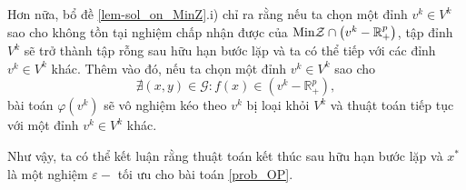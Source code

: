 \begin{cm}
Hơn nữa, bổ đề \ref{lem-sol_on_MinZ}.i) chỉ ra rằng nếu ta chọn một đỉnh $v^{k}\in V^{k}$ sao cho không tồn tại nghiệm chấp nhận được của ${\rm Min}\mathcal{Z}\cap\left(v^{k}-\mathbb{R}_{+}^{p}\right)$, tập đỉnh $V^{k}$ sẽ trở thành tập rỗng sau hữu hạn bước lặp và ta có thể tiếp với các đỉnh $v^{k}\in V^{k}$ khác. Thêm vào đó, nếu ta chọn một đỉnh $v^{k}\in V^{k}$ sao cho 
\[
\nexists (x,y)\in\mathcal{G}:f\left(x\right)\in\left(v^{k}-\mathbb{R}_{+}^{p}\right),
\]
bài toán $\varphi\left(v^{k}\right)$ sẽ vô nghiệm kéo theo
$v^{k}$ bị loại khỏi $V^{k}$ và thuật toán tiếp tục với một đỉnh
$v^{k}\in V^{k}$ khác.

Như vậy, ta có thể kết luận rằng thuật toán kết thúc sau hữu hạn bước lặp và $x^{*}$ là một nghiệm $\varepsilon-$ tối ưu cho bài toán \ref{prob_OP}.
\end{cm}





